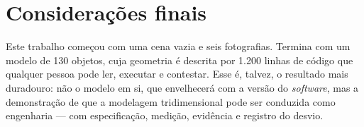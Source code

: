 \section{Considera{\c{c}}\~oes finais}

Este trabalho come{\c{c}}ou com uma cena vazia e seis fotografias. Termina com um modelo de
130 objetos, cuja geometria \'e descrita por 1.200 linhas de c\'odigo que qualquer pessoa
pode ler, executar e contestar. Esse \'e, talvez, o resultado mais duradouro: n\~ao o
modelo em si, que envelhecer\'a com a vers\~ao do \emph{software}, mas a demonstra{\c{c}}\~ao
de que a modelagem tridimensional pode ser conduzida como engenharia --- com
especifica{\c{c}}\~ao, medi{\c{c}}\~ao, evid\^encia e registro do desvio.
